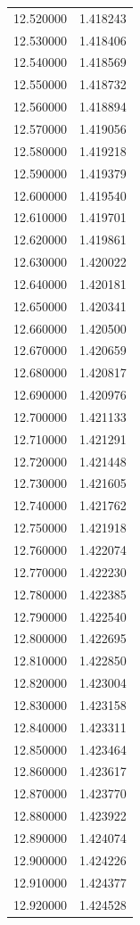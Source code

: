 \begin{tabular}{rr}
12.520000 & 1.418243 \\
12.530000 & 1.418406 \\
12.540000 & 1.418569 \\
12.550000 & 1.418732 \\
12.560000 & 1.418894 \\
12.570000 & 1.419056 \\
12.580000 & 1.419218 \\
12.590000 & 1.419379 \\
12.600000 & 1.419540 \\
12.610000 & 1.419701 \\
12.620000 & 1.419861 \\
12.630000 & 1.420022 \\
12.640000 & 1.420181 \\
12.650000 & 1.420341 \\
12.660000 & 1.420500 \\
12.670000 & 1.420659 \\
12.680000 & 1.420817 \\
12.690000 & 1.420976 \\
12.700000 & 1.421133 \\
12.710000 & 1.421291 \\
12.720000 & 1.421448 \\
12.730000 & 1.421605 \\
12.740000 & 1.421762 \\
12.750000 & 1.421918 \\
12.760000 & 1.422074 \\
12.770000 & 1.422230 \\
12.780000 & 1.422385 \\
12.790000 & 1.422540 \\
12.800000 & 1.422695 \\
12.810000 & 1.422850 \\
12.820000 & 1.423004 \\
12.830000 & 1.423158 \\
12.840000 & 1.423311 \\
12.850000 & 1.423464 \\
12.860000 & 1.423617 \\
12.870000 & 1.423770 \\
12.880000 & 1.423922 \\
12.890000 & 1.424074 \\
12.900000 & 1.424226 \\
12.910000 & 1.424377 \\
12.920000 & 1.424528 \\

\end{tabular}
